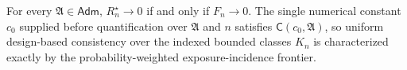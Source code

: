 For every \(\mathfrak A\in\mathsf{Adm}\), \(R_n^{\star}\to0\) if and only if \(F_n\to0\). The single numerical constant \(c_0\) supplied before quantification over \(\mathfrak A\) and \(n\) satisfies \(\mathsf C(c_0,\mathfrak A)\), so uniform design-based consistency over the indexed bounded classes \(K_n\) is characterized exactly by the probability-weighted exposure-incidence frontier.